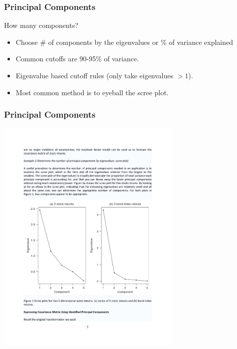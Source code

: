 \documentclass[xcolor=pdftex,dvipsnames,table,mathserif,aspectratio=169]{beamer}
\begin{document}
\begin{frame}
\frametitle{Principal Components}
How many components?
\begin{itemize}
\item Choose \# of components by the eigenvalues or \% of variance explained
\item Common cutoffs are 90-95\% of variance.
\item Eigenvalue based cutoff rules (only take eigenvalues $ > 1$).
\item Most common method is to eyeball the scree plot.
\end{itemize}
\end{frame}


\begin{frame}
\frametitle{Principal Components}
\begin{center}
\includegraphics[width=3.5in]{./resources/princomp1}
\end{center}
\end{frame}
\end{document}
